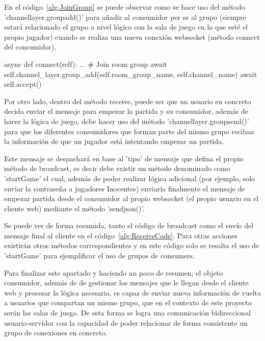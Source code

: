 En el código~\ref{alg:JoinGroup} se puede observar como se hace uso del método 'channel\textunderscore layer.group\textunderscore add()' para añadir al consumidor per se 
al grupo (siempre estará relacionado el grupo a nivel lógico con la sala de juego en la que esté el propio jugador) cuando se realiza una nueva conexión websocket (método connect del consumidor). 

\begin{mypython}[float={h},caption={Añadir consumer a un grupo},label={alg:JoinGroup}]
	async def connect(self):
		...
		# Join room group
		await self.channel_layer.group_add(self.room_group_name, self.channel_name)
		await self.accept()
									
\end{mypython}

Por otro lado, dentro del método receive, puede ser que un usuario en concreto decida enviar el mensaje para empezar la partida y su consumidor, además de hacer la lógica de juego, 
debe hacer uso del método 'channel\textunderscore layer.group\textunderscore send()' para que los diferentes consumidores que forman parte del mismo grupo reciban la 
información de que un jugador está intentando empezar un partida. 

Este mensaje se despachará en base al 'tipo' de mensaje que defina el propio método de broadcast, es decir debe
existir un método denominado como 'startGame' el cual, además de poder realizar lógica adicional (por ejemplo, solo enviar la contraseña a jugadores Inocentes) 
enviaría finalmente el mensaje de empezar partida desde el consumidor al propio websocket (el propio usuario en el cliente web) mediante el método 'send\textunderscore json()'. 

Se puede ver de forma resumida, tanto el código de broadcast como el envío del mensaje final al cliente en el código~\ref{alg:ReceiveCode}. Para otras acciones existirán
otros métodos correspondientes y en este código solo se resalta el uso de 'startGame' para ejemplificar el uso de grupos de consumers.

Para finalizar este apartado y haciendo un poco de resumen, el objeto consumidor, además de de gestionar los mensajes que le llegan desde el cliente web y procesar la lógica necesaria, 
es capaz de enviar nueva información de vuelta a usuarios que compartan un mismo grupo, que en el contexto de este proyecto serán las salas de juego. De esta forma se logra
una comunicación bidireccional usuario-servidor con la capacidad de poder relacionar de forma consistente un grupo de conexiones en concreto.

